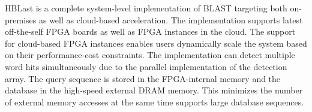HBLast is a complete system-level implementation of BLAST targeting both on-premises as well as cloud-based acceleration.
The implementation supports latest off-the-self FPGA boards as well as FPGA instances in the cloud.
The support for cloud-based FPGA instances enables users dynamically scale the system based on their performance-cost constraints.
The implementation can detect multiple word hits simultaneously due to the parallel implementation of the detection array.
The query sequence is stored in the FPGA-internal memory and the database in the high-speed external DRAM memory.
This minimizes the number of external memory accesses at the same time supports large database sequences.
